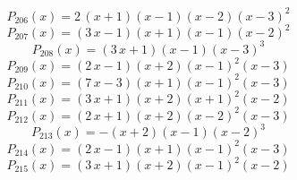 \subitem \begin{dmath*}P_{206}(x) = 2 \, {\left(x + 1\right)} {\left(x - 1\right)} {\left(x - 2\right)} {\left(x - 3\right)}^{2} \end{dmath*}\vspace{-1.2cm}
\subitem \begin{dmath*}P_{207}(x) = {\left(3 \, x - 1\right)} {\left(x + 1\right)} {\left(x - 1\right)} {\left(x - 2\right)}^{2} \end{dmath*}\vspace{-1.2cm}
\subitem \begin{dmath*}P_{208}(x) = {\left(3 \, x + 1\right)} {\left(x - 1\right)} {\left(x - 3\right)}^{3} \end{dmath*}\vspace{-1.2cm}
\subitem \begin{dmath*}P_{209}(x) = {\left(2 \, x - 1\right)} {\left(x + 2\right)} {\left(x - 1\right)}^{2} {\left(x - 3\right)} \end{dmath*}\vspace{-1.2cm}
\subitem \begin{dmath*}P_{210}(x) = {\left(7 \, x - 3\right)} {\left(x + 1\right)} {\left(x - 1\right)}^{2} {\left(x - 3\right)} \end{dmath*}\vspace{-1.2cm}
\subitem \begin{dmath*}P_{211}(x) = {\left(3 \, x + 1\right)} {\left(x + 2\right)} {\left(x + 1\right)}^{2} {\left(x - 2\right)} \end{dmath*}\vspace{-1.2cm}
\subitem \begin{dmath*}P_{212}(x) = {\left(2 \, x + 1\right)} {\left(x + 2\right)} {\left(x - 2\right)}^{2} {\left(x - 3\right)} \end{dmath*}\vspace{-1.2cm}
\subitem \begin{dmath*}P_{213}(x) = -{\left(x + 2\right)} {\left(x - 1\right)} {\left(x - 2\right)}^{3} \end{dmath*}\vspace{-1.2cm}
\subitem \begin{dmath*}P_{214}(x) = {\left(2 \, x - 1\right)} {\left(x + 1\right)} {\left(x - 1\right)}^{2} {\left(x - 3\right)} \end{dmath*}\vspace{-1.2cm}
\subitem \begin{dmath*}P_{215}(x) = {\left(3 \, x + 1\right)} {\left(x + 2\right)} {\left(x - 1\right)}^{2} {\left(x - 2\right)} \end{dmath*}\vspace{-1.2cm}
